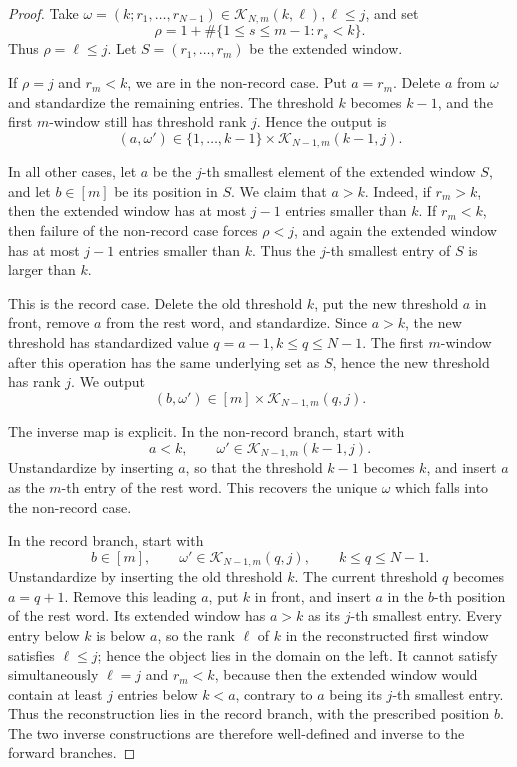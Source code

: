 \documentclass[11pt,letterpaper,reqno]{amsart}
\theoremstyle{definition}
\begin{document}
\begin{proof}
Take $\omega=(k;r_1,\ldots,r_{N-1})\in\mathcal K_{N,m}(k,\ell), \ell\le j$, and set
\[
\rho=1+\#\{1\le s\le m-1:r_s<k\}.
\]
Thus \(\rho=\ell\le j\).  Let $S=(r_1,\ldots,r_m)$ be the extended window.

If $\rho=j$ and $r_m<k$, we are in the non-record case.  Put \(a=r_m\).  Delete \(a\) from \(\omega\)
and standardize the remaining entries.  The threshold \(k\) becomes \(k-1\),
and the first \(m\)-window still has threshold rank \(j\).  Hence the output is
\[
(a,\omega')\in
\{1,\ldots,k-1\}\times\mathcal K_{N-1,m}(k-1,j).
\]

In all other cases, let \(a\) be the \(j\)-th smallest element of the extended
window \(S\), and let \(b\in[m]\) be its position in \(S\).  We claim that
\(a>k\).  Indeed, if \(r_m>k\), then the extended window has at most \(j-1\)
entries smaller than \(k\).  If \(r_m<k\), then failure of the non-record case
forces \(\rho<j\), and again the extended window has at most \(j-1\) entries
smaller than \(k\).  Thus the \(j\)-th smallest entry of \(S\) is larger than
\(k\).

This is the record case.  Delete the old threshold \(k\), put the new threshold
\(a\) in front, remove \(a\) from the rest word, and standardize.  Since
\(a>k\), the new threshold has standardized value $q=a-1, k\le q\le N-1$. The first \(m\)-window after this operation has the same underlying set as
\(S\), hence the new threshold has rank \(j\).  We output
\[
(b,\omega')\in
[m]\times \mathcal K_{N-1,m}(q,j).
\]

The inverse map is explicit.  In the non-record branch, start with
\[
a<k,\qquad \omega'\in\mathcal K_{N-1,m}(k-1,j).
\]
Unstandardize by inserting \(a\), so that the threshold \(k-1\) becomes \(k\),
and insert \(a\) as the \(m\)-th entry of the rest word.  This recovers the
unique \(\omega\) which falls into the non-record case.

In the record branch, start with
\[
b\in[m],\qquad
\omega'\in\mathcal K_{N-1,m}(q,j),\qquad k\le q\le N-1.
\]
Unstandardize by inserting the old threshold \(k\).  The current threshold
\(q\) becomes \(a=q+1\).  Remove this leading \(a\), put \(k\) in front, and
insert \(a\) in the \(b\)-th position of the rest word.  Its extended window
has \(a>k\) as its \(j\)-th smallest entry.  Every entry below \(k\) is below
\(a\), so the rank \(\ell\) of \(k\) in the reconstructed first window
satisfies \(\ell\le j\); hence the object lies in the domain on the left.
It cannot satisfy simultaneously \(\ell=j\) and \(r_m<k\), because then the
extended window would contain at least \(j\) entries below \(k<a\), contrary
to \(a\) being its \(j\)-th smallest entry.  Thus the reconstruction lies in
the record branch, with the prescribed position \(b\).  The two inverse
constructions are therefore well-defined and inverse to the forward branches.
\end{proof}
\end{document}

